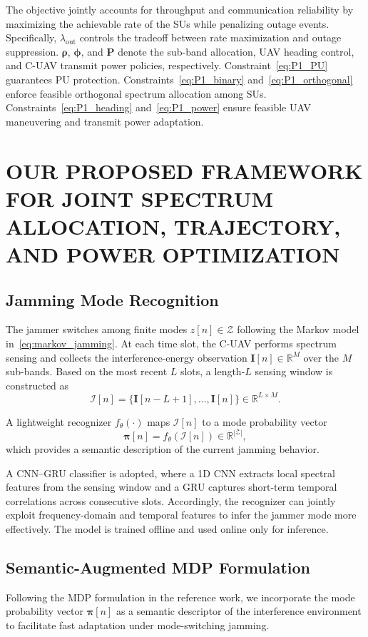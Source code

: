 \documentclass[conference]{IEEEtran}
\begin{document}
The objective jointly accounts for throughput and communication reliability by maximizing the achievable rate of the SUs while penalizing outage events. 
Specifically, $\lambda_{\mathrm{out}}$ controls the tradeoff between rate maximization and outage suppression.
$\boldsymbol{\rho}$, $\boldsymbol{\phi}$, and $\mathbf{P}$ denote the sub-band allocation, UAV heading control, and C-UAV transmit power policies, respectively. 
Constraint~\eqref{eq:P1_PU} guarantees PU protection. Constraints~\eqref{eq:P1_binary} and~\eqref{eq:P1_orthogonal} enforce feasible orthogonal spectrum allocation among SUs. 
Constraints~\eqref{eq:P1_heading} and~\eqref{eq:P1_power} ensure feasible UAV maneuvering and transmit power adaptation.

\section{OUR PROPOSED FRAMEWORK FOR JOINT SPECTRUM ALLOCATION, TRAJECTORY, AND POWER OPTIMIZATION}
\subsection{Jamming Mode Recognition}
The jammer switches among finite modes $z[n]\in\mathcal{Z}$ following the Markov model in~\eqref{eq:markov_jamming}. 
At each time slot, the C-UAV performs spectrum sensing and collects the interference-energy observation 
$\mathbf{I}[n]\in\mathbb{R}^{M}$ over the $M$ sub-bands. 
Based on the most recent $L$ slots, a length-$L$ sensing window is constructed as
\begin{equation}
\mathcal{I}[n]=\{\mathbf{I}[n-L+1],\ldots,\mathbf{I}[n]\}\in\mathbb{R}^{L\times M}.
\end{equation}

A lightweight recognizer $f_\theta(\cdot)$ maps $\mathcal{I}[n]$ to a mode probability vector
\begin{equation}
\boldsymbol{\pi}[n]=f_\theta(\mathcal{I}[n])\in\mathbb{R}^{|\mathcal{Z}|},
\end{equation}
which provides a semantic description of the current jamming behavior. 

A CNN--GRU classifier is adopted, where a 1D CNN extracts local spectral features from the sensing window and a GRU captures short-term temporal correlations across consecutive slots. 
Accordingly, the recognizer can jointly exploit frequency-domain and temporal features to infer the jammer mode more effectively.
The model is trained offline and used online only for inference.
\subsection{Semantic-Augmented MDP Formulation}
Following the MDP formulation in the reference work\cite{10506094}, we incorporate the mode probability vector
$\boldsymbol{\pi}[n]$ as a semantic descriptor of the interference environment to facilitate
fast adaptation under mode-switching jamming. 
\end{document}

